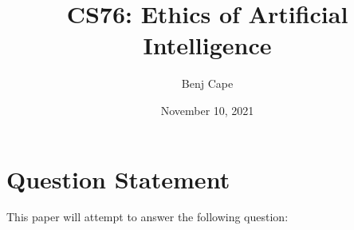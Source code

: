 \documentclass[12pt]{article}
\title{CS76: Ethics of Artificial Intelligence}
\author{Benj Cape}
\date{November 10, 2021}
\begin{document}
    \section{Question Statement}

    This paper will attempt to answer the following question: 

\maketitle
\end{document}
